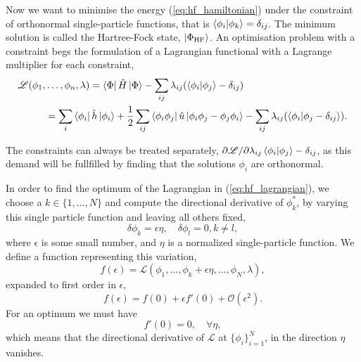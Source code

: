     Now we want to minimise the energy (\autoref{eq:hf_hamiltonian}) under the
    constraint of orthonormal single-particle functions, that is
    $\braket{\phi_i}{\phi_k} = \delta_{ij}$. The minimum solution is called the 
    Hartree-Fock state, $\ket{\Phi_{\text{HF}}}$. An optimisation problem with a 
    constraint begs the formulation of a Lagrangian functional with a Lagrange
    multiplier for each constraint,
    \begin{equation}
        \label{eq:hf_lagrangian}
        \begin{aligned}
        \mathscr{L}(\phi_1, &\dots, \phi_n, \lambda)
            = \bra{\Phi} \hat{H} \ket{\Phi} 
                - \sum_{ij}\lambda_{ij}(\braket{\phi_i}{\phi_j} - \delta_{ij}) \\
            &= \sum_i \bra{\phi_i} \hat{h} \ket{\phi_i}
                + \frac{1}{2}\sum_{ij} \bra{\phi_i \phi_j} 
                    \hat{u} \ket{\phi_i \phi_j -  \phi_j \phi_i}
                - \sum_{ij} \lambda_{ij} (\braket{\phi_i}{\phi_j - \delta_{ij}}).
        \end{aligned}
    \end{equation}

    The constraints can always be treated separately, 
    $\partial \mathscr{L}/\partial \lambda_{ij} \braket{\phi_i}{\phi_j} - \delta_{ij}$,
    as this demand will be fullfilled by finding that the solutions $\phi_i$ are 
    orthonormal.

    In order to find the optimum of the Lagrangian in (\autoref{eq:hf_lagrangian}),
    we choose a $k \in \{1, \dots, N \}$ and compute the directional derivative of
    $\phi_k^*$, by varying this single particle function and leaving all others fixed,
    \begin{equation}
        \delta \phi_k = \epsilon \eta, \quad \delta \phi_l = 0, k \neq l,
    \end{equation}
    where $\epsilon$ is some small number, and $\eta$ is a normalized single-particle 
    function. We define a function representing this variation,
    \begin{equation}
        \label{eq:variation_hf_lagrangian}
        f(\epsilon) = \mathscr{L} (\phi_1, \dots, \phi_k + \epsilon \eta,
            \dots, \phi_N, \lambda),
    \end{equation}
    expanded to first order in $\epsilon$,
    \begin{equation}
        f(\epsilon) = f(0) + \epsilon f'(0) + \mathscr{O}(\epsilon^2).
    \end{equation}
    For an optimum we must have 
    \begin{equation}
        f'(0) = 0, \quad \forall \eta,
    \end{equation}
    which means that the directional derivative of $\mathscr{L}$ at 
    $\{\phi_i\}_{i=1}^N$, in the direction $\eta$ vanishes.

